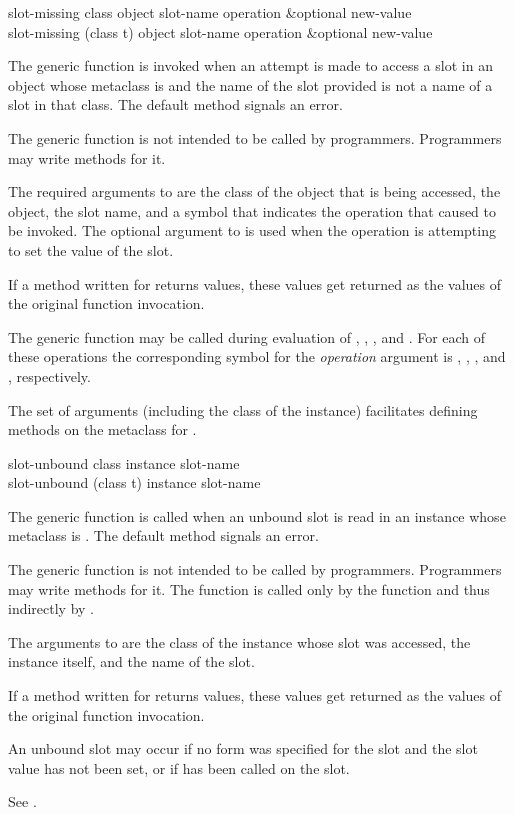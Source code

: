 \begin{defun}
slot-missing class object slot-name operation &optional new-value \\
slot-missing (class t) object slot-name operation &optional new-value

The generic function  is invoked when an attempt is
made to access a slot in an object whose metaclass is 
 and the name of the slot provided is not a name of a
slot in that class.  
The default method signals an error.

The generic function  is not intended to be called by
programmers. Programmers may write methods for it.

The required arguments to  are the class of the object
that is being accessed, the object, the slot name, and a symbol that
indicates the operation that caused   to be invoked.
The optional argument to  is used when the operation
is attempting to set the value of the slot.

If a method written for  returns values, these
values get returned as the values of the original function invocation.

The generic function  may be called during
evaluation of , , 
, and .  For each
of these operations the corresponding symbol for the \emph{operation}
argument is , , , and 
, respectively.

The set of arguments (including the class of the instance) facilitates
defining methods on the metaclass for .
\end{defun}


\begin{defun}
slot-unbound class instance slot-name \\
slot-unbound (class t) instance slot-name

The generic function  is called when an
unbound slot is read in an instance whose metaclass is 
.
The default method signals an error.

The generic function  is not intended to be called
by programmers.  Programmers may write methods for it.
The function  is called only by the function
 and thus indirectly by .

The arguments to  are the class of the instance
whose slot was accessed, the instance itself, and the name of the
slot.

If a method written for  returns values, these
values get returned as the values of the original function invocation.

An unbound slot may occur if no  form was
specified for the slot and the slot value has not been set, or if 
 has been called on the slot.

See .
\end{defun}


